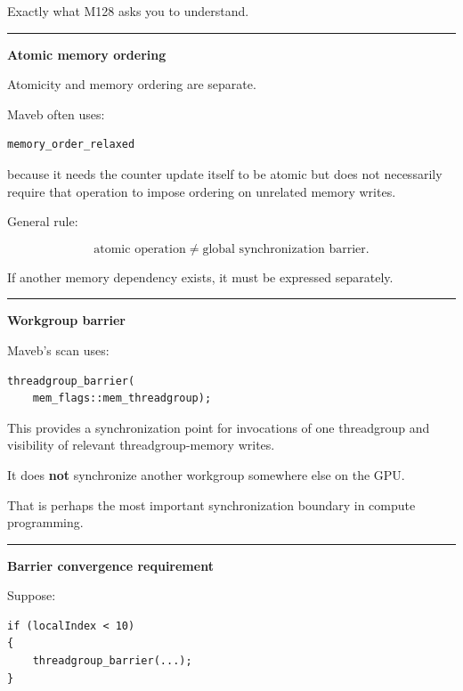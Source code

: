 Exactly what M128 asks you to understand.

\begin{center}\rule{0.5\linewidth}{0.5pt}\end{center}

\textbf{Atomic memory ordering}

Atomicity and memory ordering are separate.

Maveb often uses:

\protect{}\label{7dyn47}%
\begin{verbatim}
memory_order_relaxed
\end{verbatim}

because it needs the counter update itself to be atomic but does not necessarily require that operation to impose ordering on unrelated memory writes.

General rule:

\[
\boxed{
\text{atomic operation}
\neq
\text{global synchronization barrier}.
}
\]

If another memory dependency exists, it must be expressed separately.

\begin{center}\rule{0.5\linewidth}{0.5pt}\end{center}

\textbf{Workgroup barrier}

Maveb's scan uses:

\protect{}\label{jow2md}%
\begin{verbatim}
threadgroup_barrier(
    mem_flags::mem_threadgroup);
\end{verbatim}

This provides a synchronization point for invocations of one threadgroup and visibility of relevant threadgroup-memory writes.

It does \textbf{not} synchronize another workgroup somewhere else on the GPU.

That is perhaps the most important synchronization boundary in compute programming.

\begin{center}\rule{0.5\linewidth}{0.5pt}\end{center}

\textbf{Barrier convergence requirement}

Suppose:

\protect{}\label{sp9bsz}%
\begin{verbatim}
if (localIndex < 10)
{
    threadgroup_barrier(...);
}
\end{verbatim}

